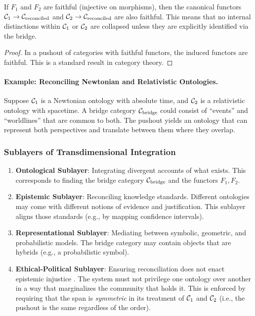 \begin{theorem}
\label{thm:conservativity}
If $F_1$ and $F_2$ are faithful (injective on morphisms), then the canonical functors $\mathcal{C}_1 \to \mathcal{C}_{\text{reconciled}}$ and $\mathcal{C}_2 \to \mathcal{C}_{\text{reconciled}}$ are also faithful. This means that no internal distinctions within $\mathcal{C}_1$ or $\mathcal{C}_2$ are collapsed unless they are explicitly identified via the bridge.
\end{theorem}
\begin{proof}
In a pushout of categories with faithful functors, the induced functors are faithful. This is a standard result in category theory.
\end{proof}

\paragraph{Example: Reconciling Newtonian and Relativistic Ontologies.}
Suppose $\mathcal{C}_1$ is a Newtonian ontology with absolute time, and $\mathcal{C}_2$ is a relativistic ontology with spacetime. A bridge category $\mathcal{C}_{\text{bridge}}$ could consist of ``events'' and ``worldlines'' that are common to both. The pushout yields an ontology that can represent both perspectives and translate between them where they overlap.

\subsubsection{Sublayers of Transdimensional Integration}
\begin{enumerate}
    \item \textbf{Ontological Sublayer}: Integrating divergent accounts of what exists. This corresponds to finding the bridge category $\mathcal{C}_{\text{bridge}}$ and the functors $F_1, F_2$.
    \item \textbf{Epistemic Sublayer}: Reconciling knowledge standards. Different ontologies may come with different notions of evidence and justification. This sublayer aligns those standards (e.g., by mapping confidence intervals).
    \item \textbf{Representational Sublayer}: Mediating between symbolic, geometric, and probabilistic models. The bridge category may contain objects that are hybrids (e.g., a probabilistic symbol).
    \item \textbf{Ethical-Political Sublayer}: Ensuring reconciliation does not enact epistemic injustice \cite{fricker2007}. The system must not privilege one ontology over another in a way that marginalizes the community that holds it. This is enforced by requiring that the span is \emph{symmetric} in its treatment of $\mathcal{C}_1$ and $\mathcal{C}_2$ (i.e., the pushout is the same regardless of the order).
\end{enumerate}

